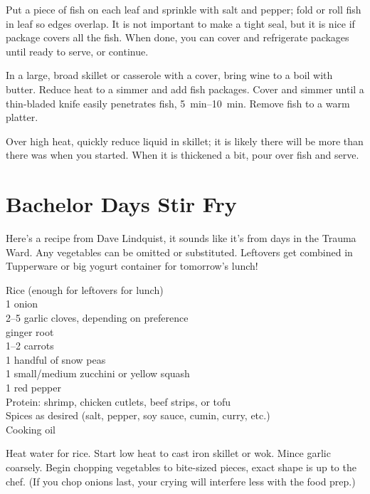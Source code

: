 Put a piece of fish on each leaf and sprinkle with salt and pepper; fold or roll
fish in leaf so edges overlap. It is not important to make a tight seal, but it
is nice if package covers all the fish. When done, you can cover and refrigerate
packages until ready to serve, or continue.

In a large, broad skillet or casserole with a cover, bring wine to a boil with
butter. Reduce heat to a simmer and add fish packages. Cover and simmer until a
thin-bladed knife easily penetrates fish, \SIrange{5}{10}{\minute}. Remove fish
to a warm platter.

Over high heat, quickly reduce liquid in skillet; it is likely there will be
more than there was when you started. When it is thickened a bit, pour over fish
and serve.

\section{Bachelor Days Stir Fry
}

\begin{open}
Here's a recipe from Dave Lindquist, it sounds like it's from days in the Trauma Ward. Any vegetables can be omitted or substituted. Leftovers get combined in Tupperware or big yogurt container for tomorrow's lunch!
\end{open}
\begin{ingredients}
    Rice (enough for leftovers for lunch)\\
    1 onion\\
    \numrange{2}{5} garlic cloves, depending on preference\\
    ginger root\\
    \numrange{1}{2} carrots\\
    1 handful of snow peas\\
    1 small/medium zucchini or yellow squash\\
    1 red pepper\\
    Protein: shrimp, chicken cutlets, beef strips, or tofu\\
    Spices as desired (salt, pepper, soy sauce, cumin, curry, etc.)\\
    Cooking oil
\end{ingredients}
Heat water for rice. Start low heat to cast iron skillet or wok. Mince garlic coarsely. Begin chopping vegetables to bite-sized pieces, exact shape is up to the chef. (If you chop onions last, your crying will interfere less with the food prep.)

